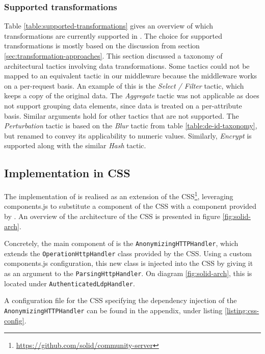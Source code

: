 

\subsubsection{Supported transformations}
Table \ref{table:supported-transformations} gives an overview of which transformations are currently supported in \middleware{}. The choice for supported transformations is mostly based on the discussion from section \ref{sec:transformation-approaches}. This section discussed a taxonomy of architectural tactics involving data transformations. Some tactics could not be mapped to an equivalent tactic in our middleware because the middleware works on a per-request basis. An example of this is the \textit{Select / Filter} tactic, which keeps a copy of the original data. The \textit{Aggregate} tactic was not applicable as \middleware{} does not support grouping data elements, since data is treated on a per-attribute basis. Similar arguments hold for other tactics that are not supported. The \textit{Perturbation} tactic is based on the \textit{Blur} tactic from table \ref{table:de-id-taxonomy}, but renamed to convey its applicability to numeric values. Similarly, \textit{Encrypt} is supported along with the similar \textit{Hash} tactic.



\subsection{Implementation in CSS}
The implementation of \middleware{} is realised as an extension of the \acrlong{CSS}\footnote{\url{https://github.com/solid/community-server}}, leveraging components.js to substitute a component of the \gls{CSS} with a component provided by \middleware{}. An overview of the architecture of the \gls{CSS} is presented in figure \ref{fig:solid-arch}.

Concretely, the main component of \middleware{} is the \texttt{AnonymizingHTTPHandler}, which extends the \texttt{OperationHttpHandler} class provided by the \gls{CSS}. Using a custom components.js configuration, this new class is injected into the \gls{CSS} by giving it as an argument to the \texttt{ParsingHttpHandler}. On diagram \ref{fig:solid-arch}, this is located under \texttt{AuthenticatedLdpHandler}.

A configuration file for the \gls{CSS} specifying the dependency injection of the \texttt{AnonymizingHTTPHandler} can be found in the appendix, under listing \ref{listing:css-config}.

